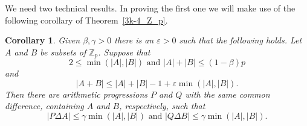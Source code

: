 \documentclass[12pt,reqno]{amsart}
\newtheorem{corollary}[theorem]{Corollary}
\theoremstyle{definition}
\renewcommand\leq{\leqslant}
\begin{document}
\vspace{5pt}
We need two technical results. In proving the first one we will make use of the
following corollary of Theorem~\ref{3k-4_Z_p}.

\begin{corollary}\label{Freiman_Zp}
Given $\beta, \gamma >0$ there is an $\varepsilon>0$ such that the following holds.
  Let $A$ and $B$ be subsets of $\mathbb{Z}_p$. Suppose that
\begin{equation}\label{eq21.-2}
    2\leq \min(|A|,|B|)\text{ and }|A|+|B| \leq (1-\beta)p
\end{equation}
and
\begin{equation}\label{eq21.-1}
    |A+B| \leq |A|+|B|-1 + \varepsilon \min(|A|,|B|).
\end{equation}
Then there are arithmetic progressions $P$ and $Q$ with the same common difference, containing $A$ and $B$, respectively,
 such that $$|P \Delta A|\leq  \gamma \min(|A|,|B|)  \text{ and }  |Q \Delta B|\leq \gamma \min(|A|,|B|).$$
\end{corollary}
\end{document}
